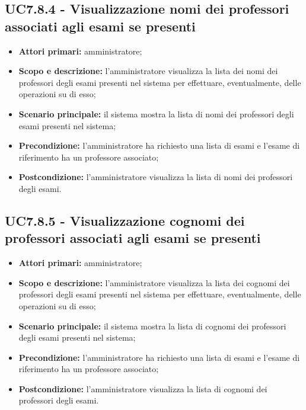 \documentclass[AnalisiDeiRequisiti.tex]{subfiles}
\begin{document}
\subsection{UC7.8.4 - Visualizzazione nomi dei professori associati agli esami se presenti}
\begin{itemize}
	\item \textbf{Attori primari:} amministratore;
	\item \textbf{Scopo e descrizione:} l'amministratore visualizza la lista dei nomi dei professori degli esami presenti nel sistema per effettuare, eventualmente, delle operazioni su di esso;
	\item \textbf{Scenario principale:} il sistema mostra la lista di nomi dei professori degli esami presenti nel sistema;
	\item \textbf{Precondizione:} l'amministratore ha richiesto una lista di esami e l'esame di riferimento ha un professore associato; 
	\item \textbf{Postcondizione:} l'amministratore visualizza la lista di nomi dei professori degli esami.
\end{itemize}
\subsection{UC7.8.5 - Visualizzazione cognomi dei professori associati agli esami se presenti}
\begin{itemize}
	\item \textbf{Attori primari:} amministratore;
	\item \textbf{Scopo e descrizione:} l'amministratore visualizza la lista dei cognomi dei professori degli esami presenti nel sistema per effettuare, eventualmente, delle operazioni su di esso;
	\item \textbf{Scenario principale:} il sistema mostra la lista di cognomi dei professori degli esami presenti nel sistema;
	\item \textbf{Precondizione:} l'amministratore ha richiesto una lista di esami e l'esame di riferimento ha un professore associato; 
	\item \textbf{Postcondizione:} l'amministratore visualizza la lista di cognomi dei professori degli esami.
\end{itemize}
\end{document}
